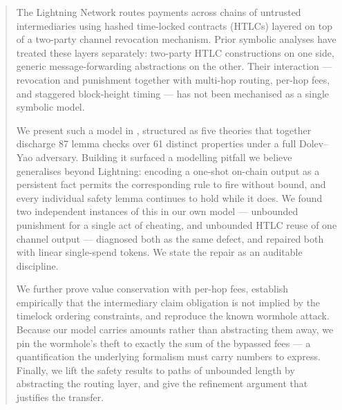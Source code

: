 \begin{abstract}
The Lightning Network routes payments across chains of untrusted
intermediaries using hashed time-locked contracts (HTLCs) layered on top of a
two-party channel revocation mechanism. Prior symbolic analyses have treated
these layers separately: two-party HTLC constructions on one side, generic
message-forwarding abstractions on the other. Their interaction --- revocation
and punishment together with multi-hop routing, per-hop fees, and staggered
block-height timing --- has not been mechanised as a single symbolic model.

We present such a model in \mtamarin, structured as five theories that together
discharge 87 lemma checks over 61 distinct properties under a full Dolev--Yao
adversary. Building it surfaced a modelling pitfall we believe generalises
beyond Lightning: encoding a one-shot on-chain output as a persistent fact
permits the corresponding rule to fire without bound, and every individual
safety lemma continues to hold while it does. We found two independent
instances of this in our own model --- unbounded punishment for a single act of
cheating, and unbounded HTLC reuse of one channel output --- diagnosed both as
the same defect, and repaired both with linear single-spend tokens. We state
the repair as an auditable discipline.

We further prove value conservation with per-hop fees, establish empirically
that the intermediary claim obligation is not implied by the timelock ordering
constraints, and reproduce the known wormhole attack. Because our model carries
amounts rather than abstracting them away, we pin the wormhole's theft to
exactly the sum of the bypassed fees --- a quantification the underlying
formalism must carry numbers to express. Finally, we lift the safety results to
paths of unbounded length by abstracting the routing layer, and give the
refinement argument that justifies the transfer.
\end{abstract}
